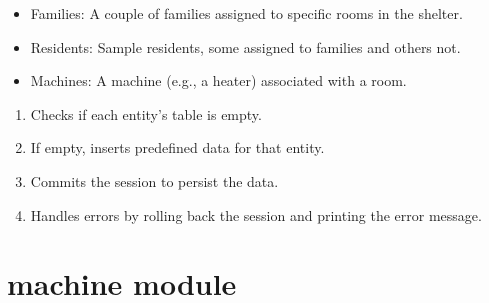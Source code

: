 \documentclass[letterpaper,10pt,english]{sphinxmanual}
\begin{document}
\begin{fulllineitems}
\begin{description}
\begin{itemize}
\item {} 
\sphinxAtStartPar
Families: A couple of families assigned to specific rooms in the shelter.

\item {} 
\sphinxAtStartPar
Residents: Sample residents, some assigned to families and others not.

\item {} 
\sphinxAtStartPar
Machines: A machine (e.g., a heater) associated with a room.

\end{itemize}

\begin{enumerate}
%
\item {} 
\sphinxAtStartPar
Checks if each entity’s table is empty.

\item {} 
\sphinxAtStartPar
If empty, inserts predefined data for that entity.

\item {} 
\sphinxAtStartPar
Commits the session to persist the data.

\item {} 
\sphinxAtStartPar
Handles errors by rolling back the session and printing the error message.

\end{enumerate}

\end{description}

\end{fulllineitems}



\section{machine module}
\label{\detokenize{app.mysql:module-app.mysql.machine}}\label{\detokenize{app.mysql:machine-module}}
\end{document}
